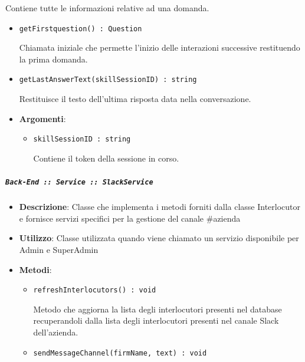 \documentclass[../DefinizioneDiProdotto.tex]{subfiles}
\begin{document}
\begin{itemize}
\begin{itemize}
\begin{itemize}
\begin{itemize}
	 Contiene tutte le informazioni relative ad una domanda.
	\end{itemize}
	\end{itemize}\vspace{0.5em}
	\begin{itemize}
	\item \texttt{getFirstquestion() : Question}\

	 Chiamata iniziale che permette l'inizio delle interazioni successive restituendo la prima domanda.
	\end{itemize}\vspace{0.5em}
	\begin{itemize}
	\item \texttt{getLastAnswerText(skillSessionID) : string}\

	 Restituisce il testo dell'ultima risposta data nella conversazione.

	\item \textbf{Argomenti}:
	\begin{itemize}
	\item \texttt{skillSessionID : string}\

	 Contiene il token della sessione in corso.
	\end{itemize}
	\end{itemize}\vspace{0.5em}
	\end{itemize}\subparagraph{\texttt{Back-End :: Service :: SlackService}}
	\begin{itemize}\item \textbf{Descrizione}: Classe che implementa i metodi forniti dalla classe Interlocutor e fornisce servizi specifici per la gestione del canale \#azienda
	\item \textbf{Utilizzo}: Classe utilizzata quando viene chiamato un servizio disponibile per Admin e SuperAdmin
	\item \textbf{Metodi}:
	\begin{itemize}
	\item \texttt{refreshInterlocutors() : void}\

	 Metodo che aggiorna la lista degli interlocutori presenti nel database recuperandoli dalla lista degli interlocutori presenti nel canale Slack dell'azienda.
	\end{itemize}\vspace{0.5em}
	\begin{itemize}
	\item \texttt{sendMessageChannel(firmName, text) : void}\


\end{itemize}
\end{itemize}
\end{itemize}
\end{document}
